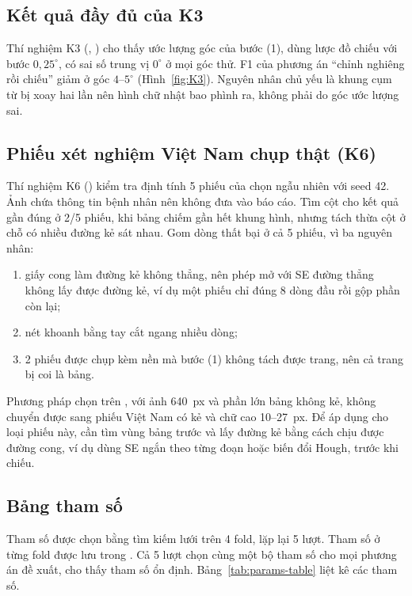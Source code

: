 \subsection{Kết quả đầy đủ của K3}
Thí nghiệm K3 (, ) cho thấy ước lượng góc của bước (1), dùng lược đồ chiếu với bước $0{,}25^\circ$, có sai số trung vị $0^\circ$ ở mọi góc thử.
F1 của phương án ``chỉnh nghiêng rồi chiếu'' giảm ở góc $4$--$5^\circ$ (Hình~\ref{fig:K3}).
Nguyên nhân chủ yếu là khung cụm từ bị xoay hai lần nên hình chữ nhật bao phình ra, không phải do góc ước lượng sai.

\subsection{Phiếu xét nghiệm Việt Nam chụp thật (K6)}
Thí nghiệm K6 () kiểm tra định tính 5 phiếu của  chọn ngẫu nhiên với seed 42.
Ảnh chứa thông tin bệnh nhân nên không đưa vào báo cáo.
Tìm cột cho kết quả gần đúng ở 2/5 phiếu, khi bảng chiếm gần hết khung hình, nhưng tách thừa cột ở chỗ có nhiều đường kẻ sát nhau.
Gom dòng thất bại ở cả 5 phiếu, vì ba nguyên nhân:
\begin{enumerate}
  \item giấy cong làm đường kẻ không thẳng, nên phép mở với SE đường thẳng không lấy được đường kẻ, ví dụ một phiếu chỉ đúng 8 dòng đầu rồi gộp phần còn lại;
  \item nét khoanh bằng tay cắt ngang nhiều dòng;
  \item 2 phiếu được chụp kèm nền mà bước (1) không tách được trang, nên cả trang bị coi là bảng.
\end{enumerate}
Phương pháp chọn trên , với ảnh 640~px và phần lớn bảng không kẻ, không chuyển được sang phiếu Việt Nam có kẻ và chữ cao 10--27~px.
Để áp dụng cho loại phiếu này, cần tìm vùng bảng trước và lấy đường kẻ bằng cách chịu được đường cong, ví dụ dùng SE ngắn theo từng đoạn hoặc biến đổi Hough, trước khi chiếu.

\subsection{Bảng tham số}
Tham số được chọn bằng tìm kiếm lưới trên 4 fold, lặp lại 5 lượt.
Tham số ở từng fold được lưu trong .
Cả 5 lượt chọn cùng một bộ tham số cho mọi phương án đề xuất, cho thấy tham số ổn định.
Bảng~\ref{tab:params-table} liệt kê các tham số.

